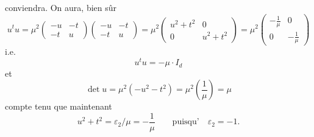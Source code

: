 \begin{enumerate}
\newpage


conviendra. On aura, bien sûr
$$ u {}^t u = \mu^2 \begin{pmatrix} -u & -t \\ -t & u \end{pmatrix} \begin{pmatrix} -u & -t \\ -t & u \end{pmatrix} = \mu^2 \begin{pmatrix} u^2+t^2 & 0 \\ 0 & u^2+t^2 \end{pmatrix} = \mu^2 \begin{pmatrix} -\frac{1}{\mu} & 0 \\ 0 & -\frac{1}{\mu} \end{pmatrix} $$
i.e.
$$ u {}^t u = -\mu \cdot I_d $$
et
$$ \det u = \mu^2 (-u^2 - t^2) = \mu^2 \left(\frac{1}{\mu}\right) = \mu $$
compte tenu que maintenant
$$ u^2 + t^2 = \varepsilon_2 / \mu = -\frac{1}{\mu} \qquad \text{puisqu'} \quad \varepsilon_2 = -1 . $$


\end{enumerate}
